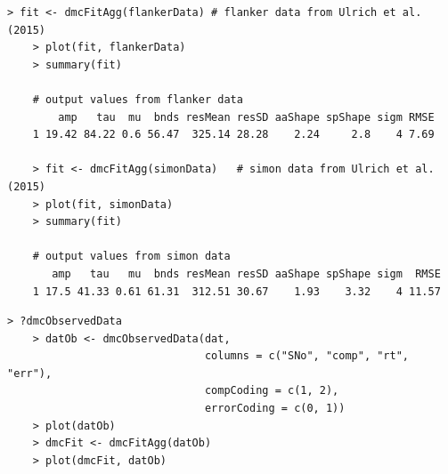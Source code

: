 \begin{minipage}{\linewidth}
    \begin{lstlisting}[style = R, title = {
    R Code Example 5: The example data from \textcite{ulrich2015automatic} can
    be fitted using the function \textit{dmcFitAgg}. This fits DMC to the
    aggregated data. A call to \textit{plot} with the output of fit as the
    first input argument and the observed data as the second input argument
    will plot the predicted values from the model fit against the observed
    values from the data (see Figures \ref{fig:5} and \ref{fig:6}). A call to
    \textit{summary} will display the parameter estimates.
    }, captionpos = t]
    > fit <- dmcFitAgg(flankerData) # flanker data from Ulrich et al. (2015)
    > plot(fit, flankerData)
    > summary(fit)
    
    # output values from flanker data
        amp   tau  mu  bnds resMean resSD aaShape spShape sigm RMSE
    1 19.42 84.22 0.6 56.47  325.14 28.28    2.24     2.8    4 7.69
    
    > fit <- dmcFitAgg(simonData)   # simon data from Ulrich et al. (2015)
    > plot(fit, simonData)
    > summary(fit)
    
    # output values from simon data
       amp   tau   mu  bnds resMean resSD aaShape spShape sigm  RMSE
    1 17.5 41.33 0.61 61.31  312.51 30.67    1.93    3.32    4 11.57
    \end{lstlisting}
\end{minipage}



\begin{minipage}{\linewidth}
    \begin{lstlisting}[style = R, 
    title = {
    R Code Example 6: The function \textit{dmcObservedData} creates the required data format to use within \textit{dmcFitAgg}.
    }, captionpos = t]
    > ?dmcObservedData
    > datOb <- dmcObservedData(dat, 
                               columns = c("SNo", "comp", "rt", "err"), 
                               compCoding = c(1, 2), 
                               errorCoding = c(0, 1)) 
    > plot(datOb)
    > dmcFit <- dmcFitAgg(datOb)
    > plot(dmcFit, datOb)
    \end{lstlisting}
\end{minipage}


